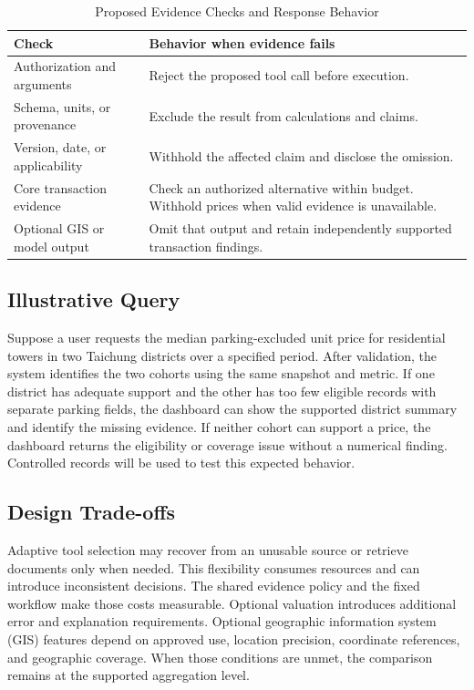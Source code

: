 \documentclass[conference]{IEEEtran}
\begin{document}
\begin{table}[t]
\caption{Proposed Evidence Checks and Response Behavior}
\label{tab:gate}
\centering
\small
\begin{tabularx}{\columnwidth}{@{}>{\raggedright\arraybackslash}p{}>{\raggedright\arraybackslash}X@{}}
\toprule
Check & Behavior when evidence fails \\
\midrule
Authorization and arguments & Reject the proposed tool call before execution. \\
Schema, units, or provenance & Exclude the result from calculations and claims. \\
Version, date, or applicability & Withhold the affected claim and disclose the omission. \\
Core transaction evidence & Check an authorized alternative within budget. Withhold prices when valid evidence is unavailable. \\
Optional GIS or model output & Omit that output and retain independently supported transaction findings. \\
\bottomrule
\end{tabularx}
\end{table}

\subsection{Illustrative Query}
Suppose a user requests the median parking-excluded unit price for residential towers in two Taichung districts over a specified period. After validation, the system identifies the two cohorts using the same snapshot and metric. If one district has adequate support and the other has too few eligible records with separate parking fields, the dashboard can show the supported district summary and identify the missing evidence. If neither cohort can support a price, the dashboard returns the eligibility or coverage issue without a numerical finding. Controlled records will be used to test this expected behavior.

\subsection{Design Trade-offs}
Adaptive tool selection may recover from an unusable source or retrieve documents only when needed. This flexibility consumes resources and can introduce inconsistent decisions. The shared evidence policy and the fixed workflow make those costs measurable. Optional valuation introduces additional error and explanation requirements. Optional geographic information system (GIS) features depend on approved use, location precision, coordinate references, and geographic coverage. When those conditions are unmet, the comparison remains at the supported aggregation level.
\end{document}

